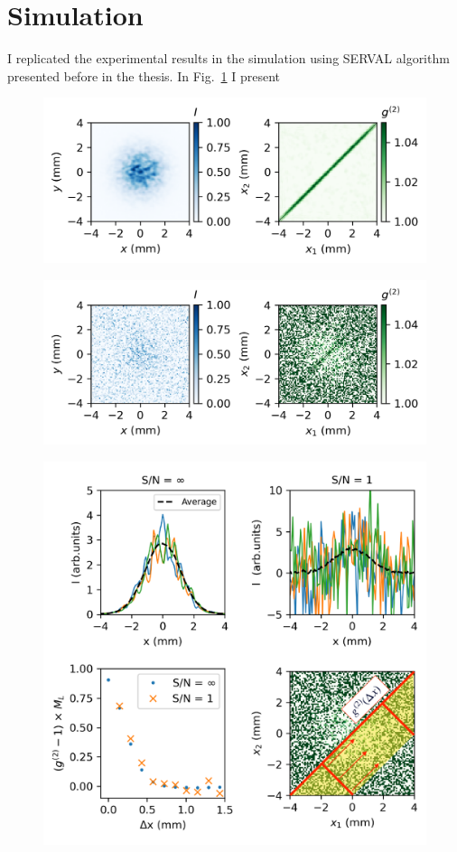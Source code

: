 \section{Simulation}
    I replicated the experimental results in the simulation using SERVAL algorithm presented before in the thesis. In Fig.~\ref{Fig:int_corr_1event} I present 
    \begin{figure}[h!]
    	\centering
        \includegraphics[width=0.66\linewidth]{content/images/ebeam_size_with_SR/int_corr_1event.png}
        \captionsetup{justification=centering}
        \caption{}
        \label{Fig:int_corr_1event}
    \end{figure}

    \begin{figure}[h!]
    	\centering
        \includegraphics[width=0.66\linewidth]{content/images/ebeam_size_with_SR/int_corr_1event_noise.png}
        \captionsetup{justification=centering}
        \caption{}
        \label{Fig:int_corr_1event_noise}
    \end{figure}

    \begin{figure}[h!]
    	\centering
        \includegraphics[width=0.66 \linewidth]{content/images/ebeam_size_with_SR/triangle_mod_full.pdf}
        \captionsetup{justification=centering}
        \caption{}
        \label{Fig:triangle}
    \end{figure}
